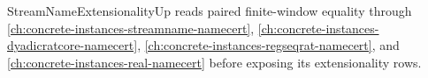 StreamNameExtensionalityUp reads paired finite-window equality through \autoref{ch:concrete-instances-streamname-namecert}, \autoref{ch:concrete-instances-dyadicratcore-namecert}, \autoref{ch:concrete-instances-regseqrat-namecert}, and \autoref{ch:concrete-instances-real-namecert} before exposing its extensionality rows.



